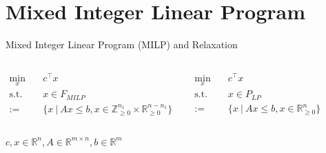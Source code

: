 \section{Mixed Integer Linear Program}

\begin{frame}{Mixed Integer Linear Program (MILP) and Relaxation}
\small
\begin{columns}

	\begin{tcolorbox}[colback=white, title={MILP (standard form)}]
    \begin{align*}
    	\min_{x}\quad &c^\top x \\
    	\text{s.t.}\quad & x\in F_{MILP} \\
    	:= &\{x \:\vert\: Ax \leq b, x \in \mathbb{Z}_{\geq 0}^{n_1} \times \mathbb{R}_{\geq 0}^{n-n_1} \}
    \end{align*}
    \end{tcolorbox}

	\begin{tcolorbox}[colback=white, title={LP Relaxation}]
    \begin{align*}
    	\min_{x}\quad &c^\top x \\
    	\text{s.t.}\quad &x \in P_{LP}\\
    	:= &\{x \:\vert\: Ax \leq b, x \in \mathbb{R}_{\geq 0}^{n}\}
    \end{align*}
    \end{tcolorbox}
\end{columns}
$c,x \in \mathbb{R}^n, A \in \mathbb{R}^{m \times n}, b \in \mathbb{R}^m$
\end{frame}


